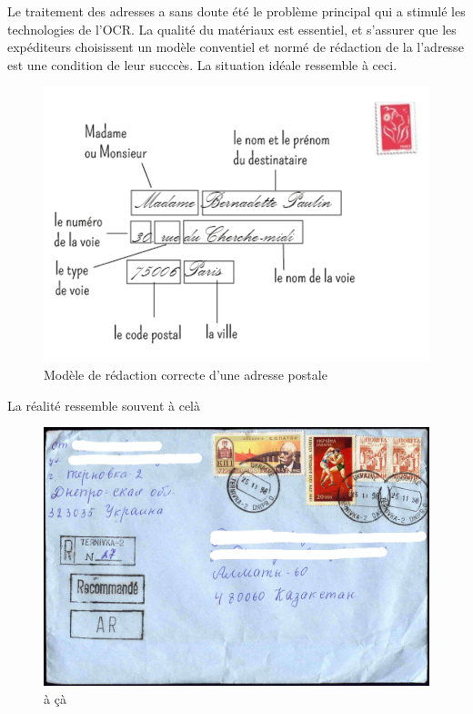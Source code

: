 \documentclass[
]{book}
\begin{document}
Le traitement des adresses a sans doute été le problème principal qui a stimulé les technologies de l'OCR. La qualité du matériaux est essentiel, et s'assurer que les expéditeurs choisissent un modèle conventiel et normé de rédaction de la l'adresse est une condition de leur succcès. La situation idéale ressemble à ceci.

\begin{figure}
\centering
\includegraphics{./images/adresse-postale.png}
\caption{Modèle de rédaction correcte d'une adresse postale}
\end{figure}

La réalité ressemble souvent à celà

\begin{figure}
\centering
\includegraphics{./images/Posted_registered_letter_cover_Ukraine1998.jpg}
\caption{à çà}
\end{figure}
\end{document}
